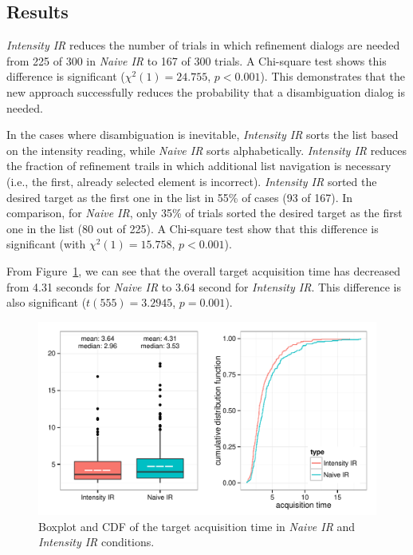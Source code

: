 \subsection{Results}
{\em Intensity IR} reduces the number of trials in which refinement dialogs are needed from 225 of 300 in {\em Naive IR} to 167 of 300 trials. A Chi-square test shows this difference is significant ($\chi^2(1) = 24.755$, $p < 0.001$). This demonstrates that the new approach successfully reduces the probability that a disambiguation dialog is needed.

In the cases where disambiguation is inevitable, {\em Intensity IR} sorts the list based on the intensity reading, while {\em Naive IR} sorts alphabetically. {\em Intensity IR} reduces the fraction of refinement trails in which additional list navigation is necessary (i.e., the first, already selected element is incorrect).  {\em Intensity IR} sorted the desired target as the first one in the list in 55\% of cases (93 of 167). In comparison, for {\em Naive IR}, only 35\% of trials sorted the desired target as the first one in the list (80 out of 225). A Chi-square test show that this difference is significant (with $\chi^2(1) = 15.758$, $p < 0.001$).

From Figure~\ref{fig:study2}, we can see that the overall target acquisition time has decreased from 4.31 seconds for {\em Naive IR} to 3.64 second for {\em Intensity IR}. This difference is also significant ($t(555)=3.2945$, $p=0.001$).




\begin{figure}[t]
\centering
\includegraphics[width=0.95\columnwidth]{figures/result_study2.pdf}
\caption{Boxplot and CDF of the target acquisition time in {\em Naive IR} and {\em Intensity IR} conditions.}
\label{fig:study2}
\end{figure}

